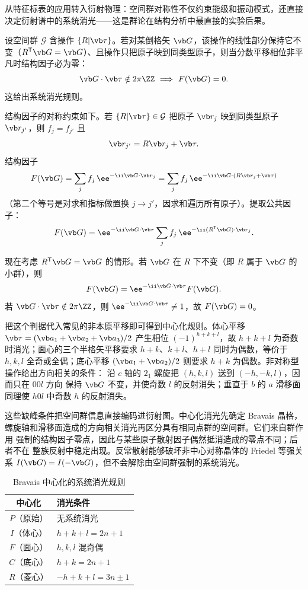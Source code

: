 从特征标表的应用转入衍射物理：空间群对称性不仅约束能级和振动模式，还直接决定衍射谱中的系统消光——这是群论在结构分析中最直接的实验后果。

\begin{theorem}[系统消光定理]

设空间群 $\mathcal G$ 含操作 $\{R|\vb\tau\}$。若对某倒格矢 $\vb G$，该操作的线性部分保持它不变（$R^{\mathsf T}\vb G=\vb G$）、且操作只把原子映到同类型原子，则当分数平移相位非平凡时结构因子必为零：
\[
\vb G\cdot\vb\tau\notin2\pi\ZZ
\ \Longrightarrow\
F(\vb G)=0.
\]
这给出系统消光规则。

\end{theorem}

结构因子的对称约束如下。若 $\{R|\vb\tau\}\in\mathcal G$ 把原子 $\vb r_j$ 映到同类型原子 $\vb r_{j'}$，则 $f_j=f_{j'}$ 且
\[
\vb r_{j'}=R\vb r_j+\vb\tau.
\]
结构因子
\[
F(\vb G)=\sum_j f_j\,\ee^{-\ii\vb G\cdot\vb r_j}
=\sum_j f_j\,\ee^{-\ii\vb G\cdot(R\vb r_j+\vb\tau)}
\]
（第二个等号是对求和指标做置换 $j\to j'$，因求和遍历所有原子）。提取公共因子：
\[
F(\vb G)=\ee^{-\ii\vb G\cdot\vb\tau}\sum_j f_j\,\ee^{-\ii(R^{\mathsf T}\vb G)\cdot\vb r_j}.
\]

现在考虑 $R^{\mathsf T}\vb G=\vb G$ 的情形。若 $\vb G$ 在 $R$ 下不变（即 $R$ 属于 $\vb G$ 的小群），则
\[
F(\vb G)=\ee^{-\ii\vb G\cdot\vb\tau}F(\vb G).
\]
若 $\vb G\cdot\vb\tau\notin2\pi\ZZ$，则 $\ee^{-\ii\vb G\cdot\vb\tau}\neq1$，故 $F(\vb G)=0$。

把这个判据代入常见的非本原平移即可得到中心化规则。体心平移
$\vb\tau=(\vb a_1+\vb a_2+\vb a_3)/2$ 产生相位 $(-1)^{h+k+l}$，故
$h+k+l$ 为奇数时消光；面心的三个半格矢平移要求 $h+k$、$k+l$、$h+l$
同时为偶数，等价于 $h,k,l$ 全奇或全偶；底心平移
$(\vb a_1+\vb a_2)/2$ 则要求 $h+k$ 为偶数。非对称型操作给出方向相关的条件：
沿 $c$ 轴的 $2_1$ 螺旋把 $(h,k,l)$ 送到 $(-h,-k,l)$，因而只在 $00l$ 方向
保持 $\vb G$ 不变，并使奇数 $l$ 的反射消失；垂直于 $b$ 的 $a$ 滑移面同理使
$h0l$ 中奇数 $h$ 的反射消失。

这些缺峰条件把空间群信息直接编码进衍射图。中心化消光先确定 Bravais 晶格，
螺旋轴和滑移面造成的方向相关消光再区分具有相同点群的空间群。它们来自群作用
强制的结构因子零点，因此与某些原子散射因子偶然抵消造成的零点不同；后者不在
整族反射中稳定出现。反常散射能够破坏非中心对称晶体的 Friedel 等强关系
$I(\vb G)=I(-\vb G)$，但不会解除由空间群强制的系统消光。

\begin{table}[htbp]
\centering
\caption{Bravais 中心化的系统消光规则}
\label{tab:extinction-rules}
\begin{tabular}{c|l}
\toprule
中心化 & 消光条件 \\
\midrule
$P$（原始） & 无系统消光 \\
$I$（体心） & $h+k+l=2n+1$ \\
$F$（面心） & $h,k,l$ 混奇偶 \\
$C$（底心） & $h+k=2n+1$ \\
$R$（菱心） & $-h+k+l=3n\pm1$ \\
\bottomrule
\end{tabular}
\end{table}

